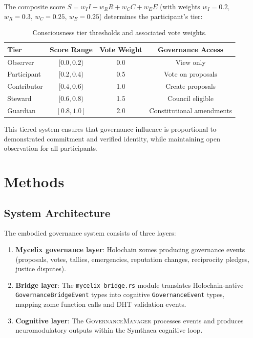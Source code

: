 \documentclass[11pt,a4paper]{article}
\begin{document}
The composite score $S = w_I I + w_R R + w_C C + w_E E$ (with weights $w_I = 0.2$, $w_R = 0.3$, $w_C = 0.25$, $w_E = 0.25$) determines the participant's tier:

\begin{table}[h]
\centering
\caption{Consciousness tier thresholds and associated vote weights.}
\label{tab:tiers}
\begin{tabular}{lccc}
\toprule
\textbf{Tier} & \textbf{Score Range} & \textbf{Vote Weight} & \textbf{Governance Access} \\
\midrule
Observer  & $[0.0, 0.2)$ & 0.0 & View only \\
Participant & $[0.2, 0.4)$ & 0.5 & Vote on proposals \\
Contributor & $[0.4, 0.6)$ & 1.0 & Create proposals \\
Steward     & $[0.6, 0.8)$ & 1.5 & Council eligible \\
Guardian    & $[0.8, 1.0]$ & 2.0 & Constitutional amendments \\
\bottomrule
\end{tabular}
\end{table}

This tiered system ensures that governance influence is proportional to demonstrated commitment and verified identity, while maintaining open observation for all participants.

\section{Methods}
\label{sec:methods}

\subsection{System Architecture}

The embodied governance system consists of three layers:

\begin{enumerate}
  \item \textbf{Mycelix governance layer}: Holochain zomes producing governance events (proposals, votes, tallies, emergencies, reputation changes, reciprocity pledges, justice disputes).
  \item \textbf{Bridge layer}: The \texttt{mycelix\_bridge.rs} module translates Holochain-native \texttt{GovernanceBridgeEvent} types into cognitive \texttt{GovernanceEvent} types, mapping zome function calls and DHT validation events.
  \item \textbf{Cognitive layer}: The \textsc{GovernanceManager} processes events and produces neuromodulatory outputs within the Symthaea cognitive loop.
\end{enumerate}
\end{document}
